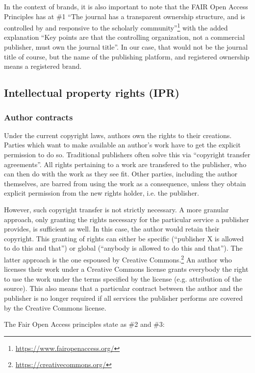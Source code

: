 \documentclass[nonflat,modfonts,output=book] {langsci/langscibook}
\newcommand{\footurl}[1]{\footnote{\url{#1}}}
\begin{document}
In the context of brands, it is also important to note that the FAIR Open Access Principles has at \#1 ``The journal has a transparent ownership structure, and is controlled by and responsive to the scholarly community''\footurl{https://www.fairopenaccess.org/} with the added explanation 
``Key points are that the controlling organization, not a commercial publisher, must own the journal title''. In our case, that would not be the journal title of course, but the name of the publishing platform, and registered ownership means a registered brand. 
 
\subsection{Intellectual property rights (IPR)}
\subsubsection{Author contracts}\label{sec:authorcontract}
Under the current copyright laws, authors own the rights to their creations. Parties which want to make available an author's work have to get the explicit permission to do so. Traditional publishers often solve this via ``copyright transfer agreements''. All rights pertaining to a work are transfered to the publisher, who can then do with the work as they see fit. Other parties, including the author themselves, are barred from using the work as a consequence, unless they obtain explicit permission from the new rights holder, i.e. the publisher. 

However, such copyright transfer is not strictly necessary. A more granular approach, only granting the rights necessary for the particular service a publisher provides, is sufficient as well. In this case, the author would retain their copyright. This granting of rights can either be specific (``publisher X is allowed to do this and that'') or global (``anybody is allowed to do this and that''). The latter approach is the one espoused by Creative Commons.\footurl{https://creativecommons.org/} An author who licenses their work under a Creative Commons license grants everybody the right to use the work under the terms specified by the license (e.g. attribution of the source). This also means that a particular contract between the author and the publisher is no longer required if all services the publisher performs are covered by the Creative Commons license. 

The Fair Open Access principles state as \#2 and \#3:
\end{document}
